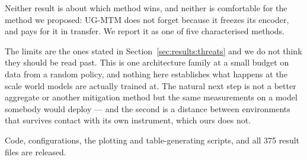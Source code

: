 Neither result is about which method wins, and neither is comfortable for the
method we proposed: UG-MTM does not forget because it freezes its encoder, and
pays for it in transfer. We report it as one of five characterised methods.

The limits are the ones stated in Section~\ref{sec:results:threats} and we do
not think they should be read past. This is one architecture family at a small
budget on data from a random policy, and nothing here establishes what happens
at the scale world models are actually trained at. The natural next step is not
a better aggregate or another mitigation method but the same measurements on a
model somebody would deploy --- and the second is a distance between
environments that survives contact with its own instrument, which ours does
not.

Code, configurations, the plotting and table-generating scripts, and all 375
result files are released.
